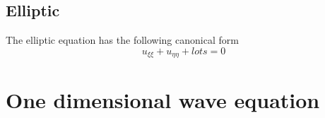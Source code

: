 \documentclass[oneside,11pt,pdftex,final]{book}%
\numberwithin{equation}{section}
\newtheorem{example}[theorem]{Example}
\numberwithin{section}{chapter}
\numberwithin{equation}{chapter}
\begin{document}
\subsection{Elliptic}
The elliptic equation has the following canonical form
\[ u_{\xi \xi}+u_{\eta \eta}+lots=0	 \]
%	
%	
%	
%	
%	
%
%	
%	
%	

\section{One dimensional wave equation}
\end{document}
